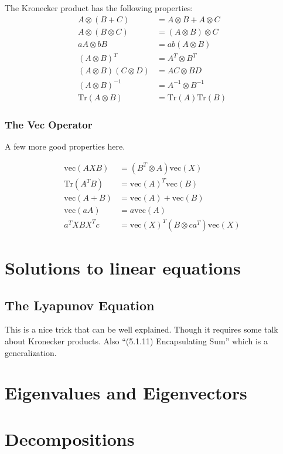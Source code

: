 \documentclass[oneside]{book}
\begin{document}
The Kronecker product has the following properties:
\begin{align}
   A \otimes (B + C) &= A \otimes B + A \otimes C \\
   A \otimes (B \otimes C) &= (A \otimes B) \otimes C \\
   a A \otimes b B &= a b (A \otimes B) \\
   (A \otimes B)^T &= A^T \otimes B^T \\
   (A \otimes B)(C \otimes D) &= AC \otimes BD \\
   (A \otimes B)^{-1} &= A^{-1} \otimes B^{-1} \\
   \mathrm{Tr}(A \otimes B) &= \mathrm{Tr}(A) \mathrm{Tr}(B)
\end{align}

\subsubsection{The Vec Operator}
A few more good properties here.

\begin{align}
   \mathrm{vec}(AXB) &= (B^T \otimes A)\mathrm{vec}(X) \\
   \mathrm{Tr}(A^TB) &= \mathrm{vec}(A)^T \mathrm{vec}(B) \\
   \mathrm{vec}(A + B) &= \mathrm{vec}(A) +  \mathrm{vec}(B) \\
   \mathrm{vec}(a A) &= a \mathrm{vec}(A) \\
   a^T X B X^T c &= \mathrm{vec}(X)^T (B\otimes ca^T) \mathrm{vec}(X)
\end{align}


\section{Solutions to linear equations}
\subsection{The Lyapunov Equation}
This is a nice trick that can be well explained.
Though it requires some talk about Kronecker products.
Also ``(5.1.11) Encapsulating Sum'' which is a generalization.

\section{Eigenvalues and Eigenvectors}

\section{Decompositions}
\end{document}
